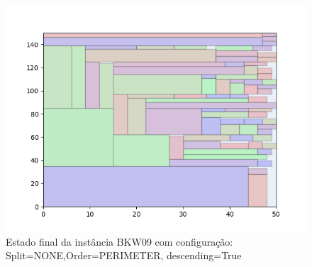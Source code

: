 \begin{figure}[H]
    \centering
    \caption[]{Estado final da instância BKW09 com configuração: Split=NONE,Order=PERIMETER, descending=True}
    \label{fig:bkw09-none-perimeter-true}
    \includegraphics[scale=0.5]{output/figures/bkw/bkw09/none/perimeter/true/000}
\end{figure}
